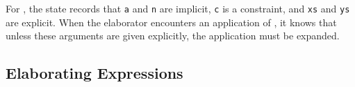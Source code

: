 \noindent
For , the state records that \texttt{a} and \texttt{n} are implicit, 
\texttt{c} is a constraint, and \texttt{xs} and \texttt{ys} are explicit. When
the elaborator encounters an application of , it knows that unless these arguments
are given explicitly, the application must be expanded.

\subsection{Elaborating Expressions}

\newcommand{\piimp}[2]{\mbox{\texttt{\{$#1$ : $#2$\} -> }}}
\newcommand{\piexp}[2]{\mbox{\texttt{($#1$ : $#2$) -> }}}
\newcommand{\piconst}[1]{\mbox{\texttt{$#1$ => }}}
\newcommand{\icase}{\mathtt{case}}
\newcommand{\iwith}{\mathtt{with}}
\newcommand{\idata}{\mathtt{data}}
\newcommand{\iclass}{\mathtt{class}}
\newcommand{\iinstance}{\mathtt{instance}}
\newcommand{\iwhere}{\mathtt{where}}
\newcommand{\iof}{\mathtt{of}}
\newcommand{\ilet}[2]{\mathtt{let}\;#1\;\mathtt{=}\;#2\;\mathtt{in}}
\newcommand{\ilam}[1]{\mathtt{\backslash}\;#1\;\mathtt{=>}}
\newcommand{\iarg}[2]{\mbox{\texttt{\{$#1$ = $#2$\}}}}
\newcommand{\ihab}[2]{\mbox{\texttt{$#1$ : $#2$}}}
\newcommand{\carg}[1]{\mbox{\texttt{\{\{$#1$\}\}}}}
\newcommand{\fatarrow}{\mbox{\texttt{=>}}}
\newcommand{\ibar}{\mbox{\texttt{|}}}
\newcommand{\mvar}[1]{\mbox{\texttt{?}}#1}

